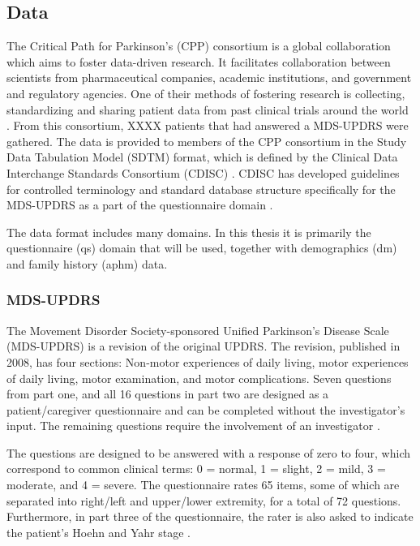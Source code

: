 \subsection{Data} %
The Critical Path for Parkinson's (CPP) consortium is a global collaboration which aims to foster data-driven research. It facilitates collaboration between scientists from pharmaceutical companies, academic institutions, and government and regulatory agencies. One of their methods of fostering research is collecting, standardizing and sharing patient data from past clinical trials around the world \cite{C-Path}. From this consortium, XXXX patients that had answered a MDS-UPDRS were gathered. The data is provided to members of the CPP consortium in the Study Data Tabulation Model (SDTM) format, which is defined by the Clinical Data Interchange Standards Consortium (CDISC) \cite{CDISC2017}. CDISC has developed guidelines for controlled terminology and standard database structure specifically for the MDS-UPDRS as a part of the questionnaire domain \cite{CDISC_mdsupdrs_2012}.
\par
The data format includes many domains. In this thesis it is primarily the questionnaire (qs) domain that will be used, together with demographics (dm) and family history (aphm) data. 


\subsubsection{MDS-UPDRS}
The Movement Disorder Society-sponsored Unified Parkinson's Disease Scale (MDS-UPDRS) is a revision of the original UPDRS. The revision, published in 2008, has four sections: Non-motor experiences of daily living, motor experiences of daily living, motor examination, and motor complications. Seven questions from part one, and all 16 questions in part two are designed as a patient/caregiver questionnaire and can be completed without the investigator's input. The remaining questions require the involvement of an investigator \cite{Goetz2008}. \par
The questions are designed to be answered with a response of zero to four, which correspond to common clinical terms: 0 = normal, 1 = slight, 2 = mild, 3 = moderate, and 4 = severe. The questionnaire rates 65 items, some of which are separated into right/left and upper/lower extremity, for a total of 72 questions. Furthermore, in part three of the questionnaire, the rater is also asked to indicate the patient's Hoehn and Yahr stage \cite{Goetz2008}.


